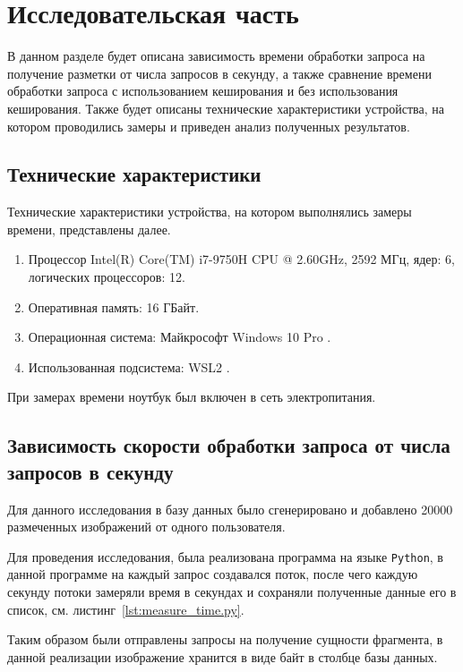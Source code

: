 \chapter{Исследовательская часть}

В данном разделе будет описана зависимость времени обработки запроса на получение разметки от числа запросов в секунду, а также сравнение времени обработки запроса с использованием кеширования и без использования кеширования. Также будет описаны технические характеристики устройства, на котором проводились замеры и приведен анализ полученных результатов.

\section{Технические характеристики}

Технические характеристики устройства, на котором выполнялись замеры времени, представлены далее.

\begin{enumerate}
	\item Процессор	Intel(R) Core(TM) i7-9750H CPU @ 2.60GHz, 2592 МГц, ядер: 6, логических процессоров: 12.
	\item Оперативная память: 16 ГБайт.
	\item Операционная система: Майкрософт Windows 10 Pro \cite{windows}.
	\item Использованная подсистема: WSL2 \cite{WSL2}.
\end{enumerate}

При замерах времени ноутбук был включен в сеть электропитания.




\section{Зависимость скорости обработки запроса от числа запросов в секунду}
Для данного исследования в базу данных было сгенерировано и добавлено 20000 размеченных изображений от одного пользователя.

Для проведения исследования, была реализована программа на языке	 \texttt{Python}, в данной программе на каждый запрос создавался поток, после чего каждую секунду потоки замеряли время в секундах и сохраняли полученные данные его в список, см. листинг~\ref{lst:measure_time.py}.

Таким образом были отправлены запросы на получение сущности фрагмента, в данной реализации изображение хранится в виде байт в столбце базы данных.

